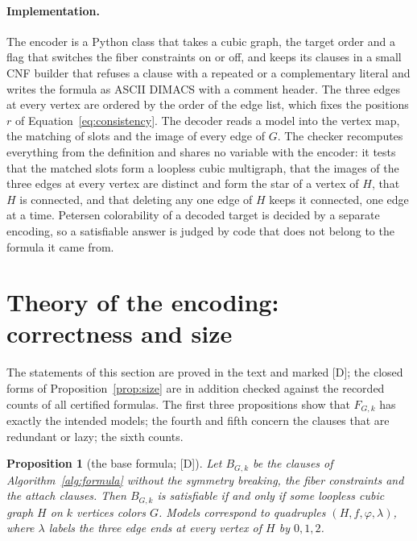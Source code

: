 \documentclass[11pt]{article}
\newtheorem{proposition}[theorem]{Proposition}
\theoremstyle{definition}
\theoremstyle{remark}
\newcommand{\evD}{\textnormal{[D]}}
\begin{document}
\paragraph{Implementation.} The encoder is a Python class that takes a cubic graph, the target order and a flag that switches the fiber constraints on or off, and keeps its clauses in a small CNF builder that refuses a clause with a repeated or a complementary literal and writes the formula as ASCII DIMACS with a comment header. The three edges at every vertex are ordered by the order of the edge list, which fixes the positions $r$ of Equation~\eqref{eq:consistency}.
The decoder reads a model into the vertex map, the matching of slots and the image of every edge of $G$. The checker recomputes everything from the definition and shares no variable with the encoder: it tests that the matched slots form a loopless cubic multigraph, that the images of the three edges at every vertex are distinct and form the star of a vertex of $H$, that $H$ is connected, and that deleting any one edge of $H$ keeps it connected, one edge at a time.
Petersen colorability of a decoded target is decided by a separate encoding, so a satisfiable answer is judged by code that does not belong to the formula it came from.

\FloatBarrier
\section{Theory of the encoding: correctness and size}\label{sec:theory}

The statements of this section are proved in the text and marked \evD; the closed forms of Proposition~\ref{prop:size} are in addition checked against the recorded counts of all
certified formulas. The first three propositions show that $F_{G,k}$ has exactly the intended models; the fourth and fifth concern the clauses that are redundant or lazy; the sixth
counts.

\begin{proposition}[the base formula; \evD]\label{prop:base}
Let $B_{G,k}$ be the clauses of Algorithm~\ref{alg:formula} without the symmetry breaking, the fiber constraints and the attach clauses. Then $B_{G,k}$ is satisfiable if and only if some loopless cubic graph $H$ on $k$
vertices colors $G$. Models correspond to quadruples $(H, f, \varphi, \lambda)$, where $\lambda$ labels the three edge ends at every vertex of $H$ by $0, 1, 2$.
\end{proposition}
\end{document}
